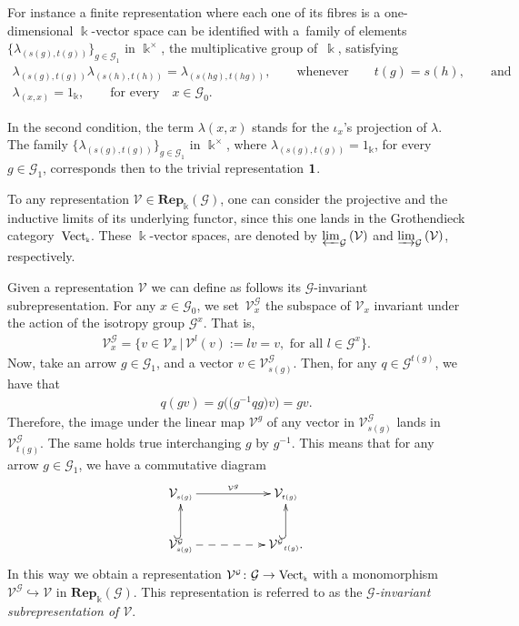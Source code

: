 \documentclass[pdftex]{sigma}
\numberwithin{equation}{section}
\newcommand{\Rep}[1]{\mathbf{Rep}_{\Sscript{\Bbbk}}(#1)}
\newcommand{\Vect}{{\rm Vect}_{\Sscript{\Bbbk}}}
\newcommand{\Go}{\cG_{\Sscript{0}}}
\newcommand{\Ga}{\cG_{\Sscript{1}}}
\newcommand{\Vx}{\cV_{\Sscript{x}}}
\newcommand{\cG}{{\mathcal G}}
\newcommand{\cV}{{\mathcal V}}
\newcommand{\Sscript}[1]{\scriptscriptstyle{#1}}
\newcommand{\prolimit}[2]{\varprojlim_{#1}\left({#2}\right)}
\newcommand{\injlimit}[2]{\varinjlim_{#1}\left({#2}\right)}
\newcommand{\Vgx}{\cV^{\Sscript{\cG}}_{\Sscript{x}}}
\newcommand{\Vgsg}{\cV^{\Sscript{\cG}}_{\Sscript{s(g)}}}
\newcommand{\Vgtg}{\cV^{\Sscript{\cG}}_{\Sscript{t(g)}}}
\begin{document}
\begin{Example}\label{exam:One}For instance a finite representation where each one of its fibres is a one-dimen\-sio\-nal $\Bbbk$-vector space can be identified with a~family of elements $\{ \lambda_{\Sscript{(s(g), t(g))}}\}_{\Sscript{ g \in \Ga}}$ in $\Bbbk^{\Sscript{\times}}$, the multiplicative group of~$\Bbbk$,
satisfying
\begin{gather*}
\lambda_{(s(g), t(g))} \lambda_{(s(h), t(h))} = \lambda_{(s(hg), t(hg))}, \qquad \text{whenever} \qquad t(g)=s(h), \qquad \text{and} \\ \lambda_{(x, x)} = 1_{\Sscript{\Bbbk}}, \qquad \text{for every} \quad x \in \Go.
\end{gather*}

In the second condition, the term $\lambda{\Sscript{(x,x)}}$ stands for the $\iota_{\Sscript{x}}$'s projection of $\lambda$. The family \linebreak $\{ \lambda_{\Sscript{(s(g), t(g))}}\}_{\Sscript{ g \in \Ga}}$ in $\Bbbk^{\Sscript{\times}}$, where $\lambda_{\Sscript{(s(g), t(g))}}=1_{\Sscript{\Bbbk}}$, for every $g \in \Ga$, corresponds then to the trivial representation $\bf 1$.
\end{Example}

To any representation $\cV \in \Rep{\cG}$, one can consider the projective and the inductive limits of its underlying functor, since this one lands in the Grothendieck category~$\Vect$. These $\Bbbk$-vector spaces, are denoted by $\prolimit{\cG}{\cV}$ and $\injlimit{\cG}{\cV}$, respectively.

Given a representation $\cV$ we can define as follows its $\cG$-invariant subrepresentation. For any $x \in \Go$, we set~$\Vgx$ the subspace of $\Vx$ invariant under the action of the isotropy group $\cG^{\Sscript{x}}$. That is,
\begin{gather*}
\Vgx=\big\{ v \in \Vx\,|\, \cV^{\Sscript{l}}(v):= l v=v, \text{ for all } l \in \cG^{\Sscript{x}} \big\}.
\end{gather*}
Now, take an arrow $g \in \Ga$, and a vector $v \in \Vgsg$. Then, for any $q \in \cG^{\Sscript{t(g)}}$, we have that
\begin{gather*}
q ( g v) = g \big( \big(g^{-1}q g\big) v \big) = g v.
\end{gather*}
Therefore, the image under the linear map $\cV^{\Sscript{g}}$ of any vector in $ \Vgsg$ lands in $ \Vgtg$. The same holds true interchanging $g$ by $g^{-1}$. This means that for any arrow $g \in
\Ga$, we have a commutative diagram
\begin{gather*}
\xymatrix{ \cV_{\Sscript{s(g)}}\ar@{->}^-{\Sscript{\cV^{\Sscript{g}}}}[rr] && \cV_{\Sscript{t(g)}}\\ \cV^{\Sscript{\cG}}_{\Sscript{s(g)}} \ar@{-->}^-{}[rr]
\ar@{^(->}^-{}[u] & & \cV^{\Sscript{\cG}}{}_{\Sscript{t(g)}}.\ar@{^(->}^-{}[u] }
\end{gather*}
In this way we obtain a representation $\cV^{\Sscript{\cG}}\colon \cG \to \Vect$ with a monomorphism $\cV^{\Sscript{\cG}} \hookrightarrow\cV$ in $\Rep{\cG}$. This representation is referred to as the \emph{$\cG$-invariant subrepresentation of $\cV$}.
\end{document}
